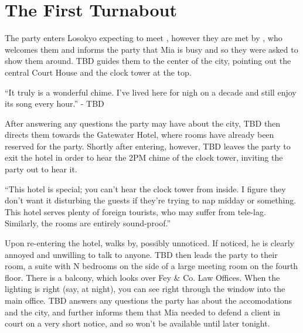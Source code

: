 \section{The First Turnabout}
The party enters Losokyo expecting to meet , however they are met by , who welcomes them and informs the party that Mia is busy and so they were asked to show them around. TBD guides them to the center of the city, pointing out the central Court House and the clock tower at the top. 
\begin{center}
``It truly is a wonderful chime. I've lived here for nigh on a decade and still enjoy its song every hour.''
- TBD \end{center}

After answering any questions the party may have about the city, TBD then directs them towards the Gatewater Hotel, where rooms have already been reserved for the party. Shortly after entering, however, TBD leaves the party to exit the hotel in order to hear the 2PM chime of the clock tower, inviting the party out to hear it.

\begin{center}
``This hotel is special; you can't hear the clock tower from inside. I figure they don't want it disturbing the guests if they're trying to nap midday or something. This hotel serves plenty of foreign tourists, who may suffer from tele-lag. Similarly, the rooms are entirely sound-proof.''
\end{center}

Upon re-entering the hotel,  walks by, possibly unnoticed. If noticed, he is clearly annoyed and unwilling to talk to anyone. TBD then leads the party to their room, a suite with N bedrooms on the side of a large meeting room on the fourth floor. There is a balcony, which looks over Fey \& Co. Law Offices. When the lighting is right (say, at night), you can see right through the window into the main office. TBD answers any questions the party has about the accomodations and the city, and further informs them that Mia needed to defend a client in court on a very short notice, and so won't be available until later tonight.

